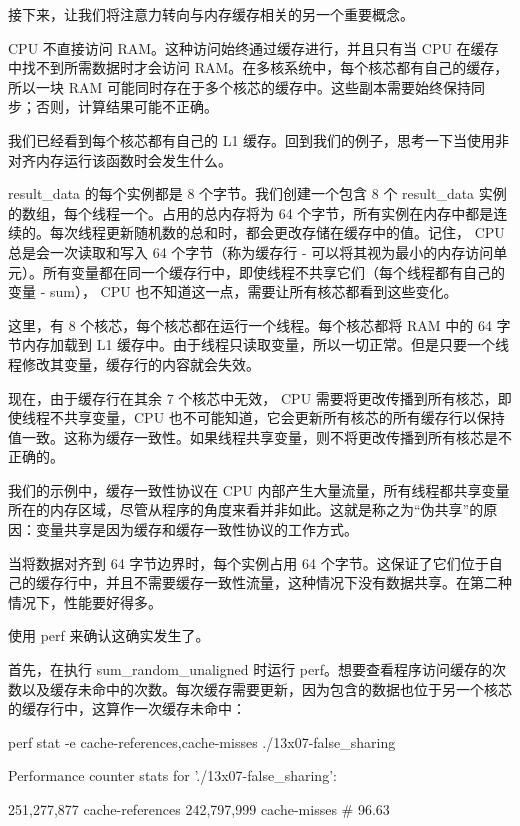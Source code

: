 接下来，让我们将注意力转向与内存缓存相关的另一个重要概念。


CPU 不直接访问 RAM。这种访问始终通过缓存进行，并且只有当 CPU 在缓存中找不到所需数据时才会访问 RAM。在多核系统中，每个核芯都有自己的缓存，所以一块 RAM 可能同时存在于多个核芯的缓存中。这些副本需要始终保持同步；否则，计算结果可能不正确。

我们已经看到每个核芯都有自己的 L1 缓存。回到我们的例子，思考一下当使用非对齐内存运行该函数时会发生什么。

result\_data 的每个实例都是 8 个字节。我们创建一个包含 8 个 result\_data 实例的数组，每个线程一个。占用的总内存将为 64 个字节，所有实例在内存中都是连续的。每次线程更新随机数的总和时，都会更改存储在缓存中的值。记住， CPU 总是会一次读取和写入 64 个字节（称为缓存行 - 可以将其视为最小的内存访问单元）。所有变量都在同一个缓存行中，即使线程不共享它们（每个线程都有自己的变量 - sum）， CPU 也不知道这一点，需要让所有核芯都看到这些变化。

这里，有 8 个核芯，每个核芯都在运行一个线程。每个核芯都将 RAM 中的 64 字节内存加载到 L1 缓存中。由于线程只读取变量，所以一切正常。但是只要一个线程修改其变量，缓存行的内容就会失效。

现在，由于缓存行在其余 7 个核芯中无效， CPU 需要将更改传播到所有核芯，即使线程不共享变量，CPU 也不可能知道，它会更新所有核芯的所有缓存行以保持值一致。这称为缓存一致性。如果线程共享变量，则不将更改传播到所有核芯是不正确的。

我们的示例中，缓存一致性协议在 CPU 内部产生大量流量，所有线程都共享变量所在的内存区域，尽管从程序的角度来看并非如此。这就是称之为“伪共享”的原因：变量共享是因为缓存和缓存一致性协议的工作方式。

当将数据对齐到 64 字节边界时，每个实例占用 64 个字节。这保证了它们位于自己的缓存行中，并且不需要缓存一致性流量，这种情况下没有数据共享。在第二种情况下，性能要好得多。

使用 perf 来确认这确实发生了。

首先，在执行 sum\_random\_unaligned 时运行 perf。想要查看程序访问缓存的次数以及缓存未命中的次数。每次缓存需要更新，因为包含的数据也位于另一个核芯的缓存行中，这算作一次缓存未命中：

\begin{shell}
perf stat -e cache-references,cache-misses ./13x07-false_sharing
\end{shell}

\begin{shell}
Performance counter stats for './13x07-false_sharing':

     251,277,877     cache-references
     242,797,999     cache-misses
                     # 96.63%
\end{shell}

